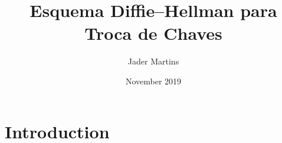 \documentclass{article}
\title{Esquema Diffie–Hellman para Troca de Chaves}
\author{Jader Martins}
\date{November 2019}
\begin{document}
\maketitle

\section{Introduction}
\end{document}
